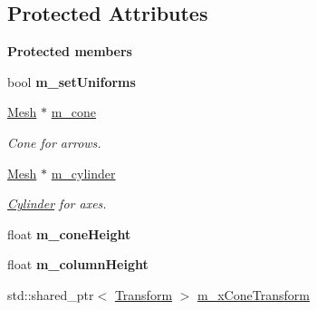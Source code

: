 \subsection*{Protected Attributes}
\begin{Indent}\textbf{ Protected members}\par
\begin{DoxyCompactItemize}
\item 
\mbox{\label{classrev_1_1_debug_coordinate_axes_ae66e15dd16911f52ee57a9b1961e18c4}} 
bool {\bfseries m\+\_\+set\+Uniforms}
\item 
\mbox{\label{classrev_1_1_debug_coordinate_axes_a1ee519ba51f3487872d63fde4dd1d85e}} 
\mbox{\hyperlink{classrev_1_1_mesh}{Mesh}} $\ast$ \mbox{\hyperlink{classrev_1_1_debug_coordinate_axes_a1ee519ba51f3487872d63fde4dd1d85e}{m\+\_\+cone}}
\begin{DoxyCompactList}\small\item\em Cone for arrows. \end{DoxyCompactList}\item 
\mbox{\label{classrev_1_1_debug_coordinate_axes_ad264642cf9283d68a3d22c659d0961b1}} 
\mbox{\hyperlink{classrev_1_1_mesh}{Mesh}} $\ast$ \mbox{\hyperlink{classrev_1_1_debug_coordinate_axes_ad264642cf9283d68a3d22c659d0961b1}{m\+\_\+cylinder}}
\begin{DoxyCompactList}\small\item\em \mbox{\hyperlink{classrev_1_1_cylinder}{Cylinder}} for axes. \end{DoxyCompactList}\item 
\mbox{\label{classrev_1_1_debug_coordinate_axes_ab41adfa50e3a8d677b02723c8f264f9e}} 
float {\bfseries m\+\_\+cone\+Height}
\item 
\mbox{\label{classrev_1_1_debug_coordinate_axes_a40fab235834b500bcce3a04a66cb08eb}} 
float {\bfseries m\+\_\+column\+Height}
\item 
\mbox{\label{classrev_1_1_debug_coordinate_axes_aef701e9b836de40faecfbe6b69a922b5}} 
std\+::shared\+\_\+ptr$<$ \mbox{\hyperlink{classrev_1_1_transform}{Transform}} $>$ \mbox{\hyperlink{classrev_1_1_debug_coordinate_axes_aef701e9b836de40faecfbe6b69a922b5}{m\+\_\+x\+Cone\+Transform}}

\end{DoxyCompactItemize}
\end{Indent}
